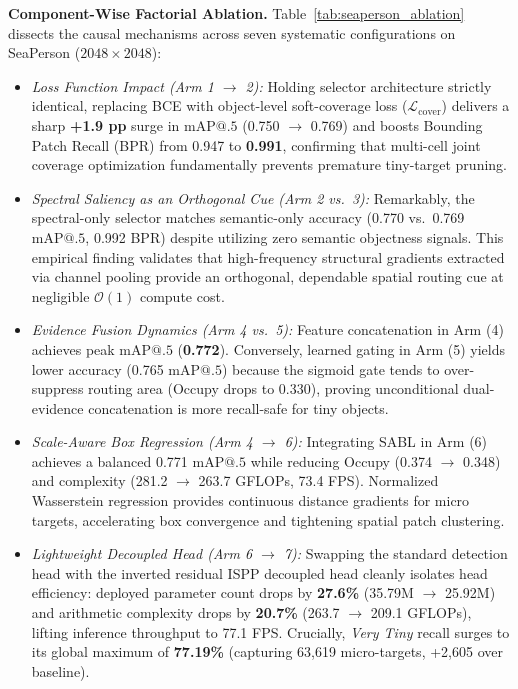 \textbf{Component-Wise Factorial Ablation.} Table~\ref{tab:seaperson_ablation} dissects the causal mechanisms across seven systematic configurations on SeaPerson ($2048\times 2048$):
\begin{itemize}
    \item \emph{Loss Function Impact (Arm 1 $\to$ 2):} Holding selector architecture strictly identical, replacing BCE with object-level soft-coverage loss ($\mathcal{L}_{\mathrm{cover}}$) delivers a sharp \textbf{+1.9 pp} surge in $\mathrm{mAP@.5}$ (0.750 $\to$ 0.769) and boosts Bounding Patch Recall (BPR) from 0.947 to \textbf{0.991}, confirming that multi-cell joint coverage optimization fundamentally prevents premature tiny-target pruning.
    \item \emph{Spectral Saliency as an Orthogonal Cue (Arm 2 vs.\ 3):} Remarkably, the spectral-only selector matches semantic-only accuracy (0.770 vs.\ 0.769 $\mathrm{mAP@.5}$, 0.992 BPR) despite utilizing zero semantic objectness signals. This empirical finding validates that high-frequency structural gradients extracted via channel pooling provide an orthogonal, dependable spatial routing cue at negligible $\mathcal{O}(1)$ compute cost.
    \item \emph{Evidence Fusion Dynamics (Arm 4 vs.\ 5):} Feature concatenation in Arm (4) achieves peak $\mathrm{mAP@.5}$ (\textbf{0.772}). Conversely, learned gating in Arm (5) yields lower accuracy (0.765 $\mathrm{mAP@.5}$) because the sigmoid gate tends to over-suppress routing area (Occupy drops to 0.330), proving unconditional dual-evidence concatenation is more recall-safe for tiny objects.
    \item \emph{Scale-Aware Box Regression (Arm 4 $\to$ 6):} Integrating SABL in Arm (6) achieves a balanced 0.771 $\mathrm{mAP@.5}$ while reducing Occupy (0.374 $\to$ 0.348) and complexity (281.2 $\to$ 263.7 GFLOPs, 73.4 FPS). Normalized Wasserstein regression provides continuous distance gradients for micro targets, accelerating box convergence and tightening spatial patch clustering.
    \item \emph{Lightweight Decoupled Head (Arm 6 $\to$ 7):} Swapping the standard detection head with the inverted residual ISPP decoupled head cleanly isolates head efficiency: deployed parameter count drops by \textbf{27.6\%} (35.79M $\to$ 25.92M) and arithmetic complexity drops by \textbf{20.7\%} (263.7 $\to$ 209.1 GFLOPs), lifting inference throughput to 77.1 FPS. Crucially, \emph{Very Tiny} recall surges to its global maximum of \textbf{77.19\%} (capturing 63,619 micro-targets, +2,605 over baseline).
\end{itemize}

